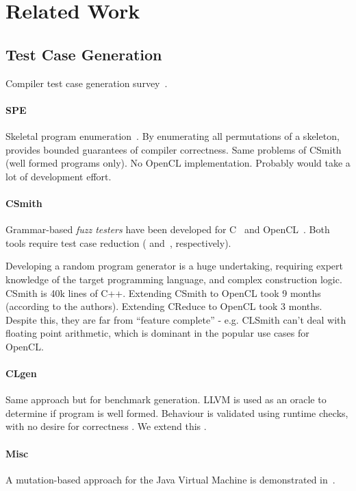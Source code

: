 \section{Related Work}\label{sec:rw}

\subsection{Test Case Generation}

Compiler test case generation survey~\cite{Boujarwah1997}.

\paragraph{SPE} Skeletal program enumeration~\cite{Zhang2016b}. By enumerating all permutations of a skeleton, provides bounded guarantees of compiler correctness. Same problems of CSmith (well formed programs only). No OpenCL implementation. Probably would take a lot of development effort. 

\paragraph{CSmith} Grammar-based \emph{fuzz testers} have been developed for C~\cite{Yang2011} and OpenCL~\cite{Lidbury2015a}. Both tools require test case reduction (\cite{Regehr2012a} and~\cite{Pflanzer2016}, respectively).

Developing a random program generator is a huge undertaking, requiring expert knowledge of the target programming language, and complex construction logic. CSmith is 40k lines of C++. Extending CSmith to OpenCL took 9 months (according to the authors). Extending CReduce to OpenCL took 3 months. Despite this, they are far from ``feature complete'' - e.g. CLSmith can't deal with floating point arithmetic, which is dominant in the popular use cases for OpenCL.

\paragraph{CLgen} Same approach but for benchmark generation. LLVM is used as an oracle to determine if program is well formed. Behaviour is validated using runtime checks, with no desire for correctness \cite{Cummins2017a}. We extend this \cec{\ldots}.

\paragraph{Misc} A mutation-based approach for the Java Virtual Machine is demonstrated in~\cite{Chena}.

